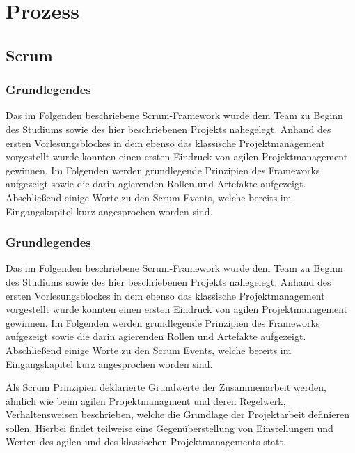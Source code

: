 \chapter{Prozess}
\label{ch:process}

\section{Scrum}
\label{sec:scrum}

\subsection{Grundlegendes}

Das im Folgenden beschriebene Scrum-Framework wurde dem Team zu Beginn des Studiums sowie des hier beschriebenen Projekts nahegelegt. Anhand des ersten Vorlesungsblockes in dem ebenso das klassische Projektmanagement vorgestellt wurde konnten einen ersten Eindruck von agilen Projektmanagement gewinnen. Im Folgenden werden grundlegende Prinzipien des Frameworks aufgezeigt sowie die darin agierenden Rollen und Artefakte aufgezeigt. Abschließend einige Worte zu den Scrum Events, welche bereits im Eingangskapitel kurz angesprochen worden sind.

\subsection{Grundlegendes}

Das im Folgenden beschriebene Scrum-Framework wurde dem Team zu Beginn des Studiums sowie des hier beschriebenen Projekts nahegelegt. Anhand des ersten Vorlesungsblockes in dem ebenso das klassische Projektmanagement vorgestellt wurde konnten einen ersten Eindruck von agilen Projektmanagement gewinnen. Im Folgenden werden grundlegende Prinzipien des Frameworks aufgezeigt sowie die darin agierenden Rollen und Artefakte aufgezeigt. Abschließend einige Worte zu den Scrum Events, welche bereits im Eingangskapitel kurz angesprochen worden sind.

Als Scrum Prinzipien deklarierte Grundwerte der Zusammenarbeit werden, ähnlich wie beim agilen Projektmanagment und deren Regelwerk, Verhaltensweisen beschrieben, welche die Grundlage der Projektarbeit definieren sollen.
Hierbei findet teilweise eine Gegenüberstellung von Einstellungen und Werten des agilen und des klassischen Projektmanagements statt. 
 
